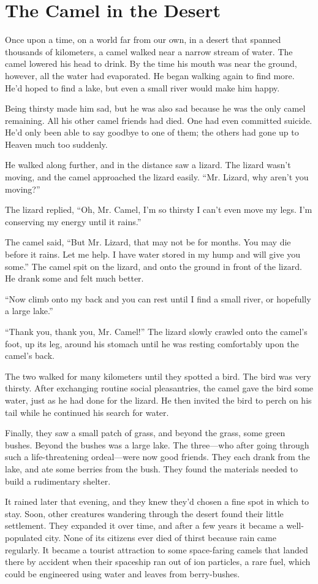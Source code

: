 \chapter{The Camel in the Desert}

Once upon a time, on a world far from our own, in a desert that spanned thousands of kilometers, a camel walked near a narrow stream of water. The camel lowered his head to drink. By the time his mouth was near the ground, however, all the water had evaporated. He began walking again to find more. He'd hoped to find a lake, but even a small river would make him happy.

Being thirsty made him sad, but he was also sad because he was the only camel remaining. All his other camel friends had died. One had even committed suicide. He'd only been able to say goodbye to one of them; the others had gone up to Heaven much too suddenly.

He walked along further, and in the distance saw a lizard. The lizard wasn't moving, and the camel approached the lizard easily. “Mr. Lizard, why aren't you moving?”

The lizard replied, “Oh, Mr. Camel, I'm so thirsty I can't even move my legs. I'm conserving my energy until it rains.”

The camel said, “But Mr. Lizard, that may not be for months. You may die before it rains. Let me help. I have water stored in my hump and will give you some.” The camel spit on the lizard, and onto the ground in front of the lizard. He drank some and felt much better.

“Now climb onto my back and you can rest until I find a small river, or hopefully a large lake.”

“Thank you, thank you, Mr. Camel!” The lizard slowly crawled onto the camel's foot, up its leg, around his stomach until he was resting comfortably upon the camel's back.

The two walked for many kilometers until they spotted a bird. The bird was very thirsty. After exchanging routine social pleasantries, the camel gave the bird some water, just as he had done for the lizard. He then invited the bird to perch on his tail while he continued his search for water.

Finally, they saw a small patch of grass, and beyond the grass, some green bushes. Beyond the bushes was a large lake. The three—who after going through such a life-threatening ordeal—were now good friends. They each drank from the lake, and ate some berries from the bush. They found the materials needed to build a rudimentary shelter.

It rained later that evening, and they knew they'd chosen a fine spot in which to stay. Soon, other creatures wandering through the desert found their little settlement. They expanded it over time, and after a few years it became a well-populated city. None of its citizens ever died of thirst because rain came regularly. It became a tourist attraction to some space-faring camels that landed there by accident when their spaceship ran out of ion particles, a rare fuel, which could be engineered using water and leaves from berry-bushes.